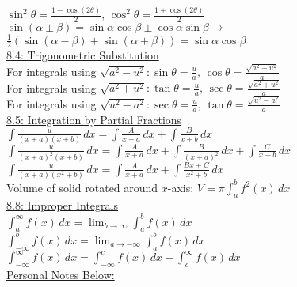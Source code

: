 \documentclass[10pt,a5paper]{report}
\begin{document}
\begin{multicols*}{2}
	$\sin^{2}{\theta}=\frac{1-\cos{\left(2\theta\right)}}{2},\,\cos^{2}{\theta}=\frac{1+\cos{\left(2\theta\right)}}{2}$ \\

	$ \sin{\left(\alpha\pm\beta\right)}=\sin{\alpha}\cos{\beta}\pm\cos{\alpha}\sin{\beta}\rightarrow$ \\
	
	$ \frac{1}{2}\left(\sin{\left(\alpha-\beta\right)}+\sin{\left(\alpha+\beta\right)}\right)=
	   \sin{\alpha}\cos{\beta}$ \\
	   
	\underline{8.4: Trigonometric Substitution} \\
	
	For integrals using $\sqrt{a^{2}-u^{2}}: \sin{\theta}=\frac{u}{a},\, \cos{\theta}=\frac{\sqrt{a^{2}-u^{2}}}{a}$ \\

	For integrals using $\sqrt{a^{2}+u^{2}}: \tan{\theta}=\frac{u}{a},\, \sec{\theta}=\frac{\sqrt{a^{2}+u^{2}}}{a}$ \\ 

	For integrals using $\sqrt{u^{2}-a^{2}}: \sec{\theta}=\frac{u}{a},\, \tan{\theta}=\frac{\sqrt{u^{2}-a^{2}}}{a}$ \\
	
	\underline{8.5: Integration by Partial Fractions} \\
	
	$\int{\frac{u}{(x+a)(x+b)}}\,dx=\int{\frac{A}{x+a}}\,dx+\int{\frac{B}{x+b}}\,dx$ \\
	
	$\int{\frac{u}{(x+a)^{2}(x+b)}}\,dx=\int{\frac{A}{x+a}}\,dx+\int{\frac{B}{(x+a)^{2}}}\,dx+\int{\frac{C}{x+b}}\,dx$ \\
	
	$\int{\frac{u}{(x+a)(x^{2}+b)}\,dx=\int{\frac{A}{x+a}}\,dx+\int{\frac{Bx+C}{x^{2}+b}}}\,dx$ \\
	
	Volume of solid rotated around $x$-axis: $V=\pi\int_{a}^{b}{f^{2}(x)}\,dx$ \\
	
	\underline{8.8: Improper Integrals} \\
	
	$\int_{a}^{\infty}{f(x)}\,dx=\lim_{b\to\infty}\int_{a}^{b}{f(x)}\,dx$ \\
	
	$\int_{-\infty}^{b}{f(x)}\,dx=\lim_{a\to-\infty}\int_{a}^{b}{f(x)}\,dx$ \\
	
	$\int_{-\infty}^{\infty}{f(x)}\,dx=\int_{-\infty}^{c}{f(x)}\,dx+\int_{c}^{\infty}{f(x)}\,dx$ \\
	
	\underline{Personal Notes Below:} \\
\end{multicols*}
\end{document}
